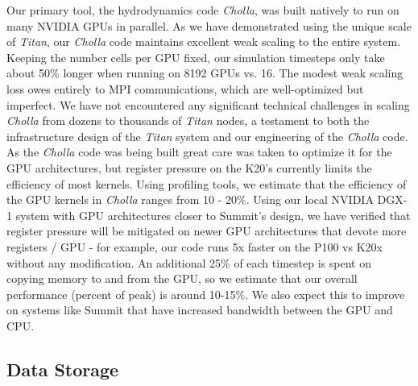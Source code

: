 \documentclass[11pt,letterpaper,english]{article}
\begin{document}
Our primary tool, the hydrodynamics code \textit{Cholla}, was built natively to run on many NVIDIA GPUs
in parallel. As we have demonstrated using the unique scale of \textit{Titan}, our \textit{Cholla} code
maintains excellent weak scaling to the entire system. Keeping the number cells per GPU fixed, our simulation
timesteps only take about 50\% longer when running on 8192 GPUs vs. 16. The modest weak scaling loss owes
entirely to MPI communications, which are well-optimized but imperfect. We have not encountered any 
significant technical challenges in scaling \textit{Cholla} from dozens to thousands of \textit{Titan} nodes,
a testament to both the infrastructure design of the \textit{Titan} system and our engineering of the
\textit{Cholla} code. As the \textit{Cholla} code was being built great care was taken to optimize it for the GPU architectures, but register pressure on the K20's currently limits the efficiency of most kernels.
Using profiling tools, we estimate that the efficiency of the GPU kernels in \textit{Cholla} ranges from 10 - 20\%. Using our local NVIDIA DGX-1 system with GPU architectures closer to Summit's design, we have verified that register pressure will be mitigated on newer GPU architectures that devote more registers / GPU - for example, our code runs 5x faster on the P100 vs K20x without any modification.
An additional 25\% of each timestep is spent on copying memory to and from the GPU, so we estimate that our overall performance (percent of peak) is around 10-15\%. We also expect this to improve on systems like Summit
that have increased bandwidth between the GPU and CPU.


\subsection{Data Storage} 
\end{document}
